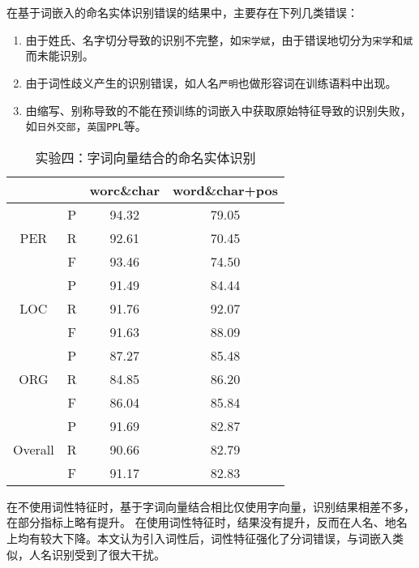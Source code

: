 在基于词嵌入的命名实体识别错误的结果中，主要存在下列几类错误：
\begin{enumerate}
    \item 由于姓氏、名字切分导致的识别不完整，如\verb|宋学斌|，由于错误地切分为\verb|宋学|和\verb|斌|而未能识别。
    \item 由于词性歧义产生的识别错误，如人名\verb|严明|也做形容词在训练语料中出现。
    \item 由缩写、别称导致的不能在预训练的词嵌入中获取原始特征导致的识别失败，如\verb|日外交部|，\verb|英国PPL|等。
\end{enumerate}

\begin{table}[H]
    \centering
    \caption{实验四：字词向量结合的命名实体识别}
    \begin{tabular}{cccc}
        \toprule
        && worc\&char & word\&char+pos\\
        \midrule
        \multirow{3}{*}{PER} & P & 94.32 & 79.05\\
        & R & 92.61 & 70.45\\
        & F & 93.46 & 74.50 \\
        \midrule
        \multirow{3}{*}{LOC} & P & 91.49 & 84.44\\
        & R & 91.76 & 92.07 \\
        & F & 91.63 & 88.09\\
        \midrule
        \multirow{3}{*}{ORG} & P & 87.27 & 85.48\\
        & R & 84.85 & 86.20\\
        & F & 86.04 & 85.84\\
        \midrule
        \multirow{3}{*}{Overall} & P & 91.69 & 82.87\\
        & R & 90.66 & 82.79\\
        & F & 91.17  & 82.83\\
        \bottomrule
    \end{tabular}
    \label{tab:word_char_comparison}
\end{table}
在不使用词性特征时，基于字词向量结合相比仅使用字向量，识别结果相差不多，在部分指标上略有提升。
在使用词性特征时，结果没有提升，反而在人名、地名上均有较大下降。本文认为引入词性后，词性特征强化了分词错误，与词嵌入类似，人名识别受到了很大干扰。

